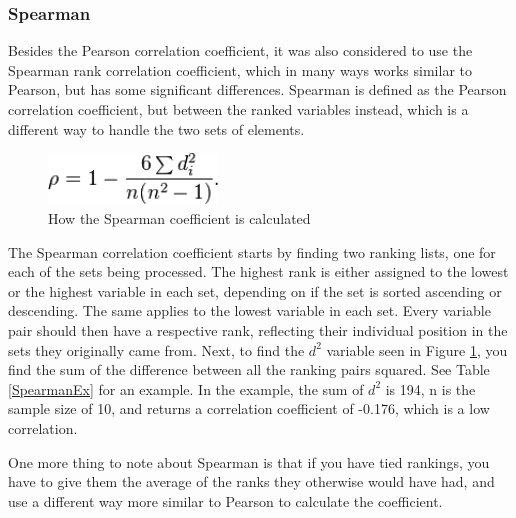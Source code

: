 \subsubsection{Spearman}

Besides the Pearson correlation coefficient, it was also considered to use the Spearman rank correlation coefficient, which in many ways works similar to Pearson, but has some significant differences. Spearman is defined as the Pearson correlation coefficient, but between the ranked variables instead, which is a different way to handle the two sets of elements. \cite{Spearman2}

\begin{figure}[htb]
\centering
\includegraphics[width=0.4\textwidth]{Images/SpearmanCalc.png}
\caption{How the Spearman coefficient is calculated \cite{Spearman2}}
\label{SpearCalc}
\end{figure}

The Spearman correlation coefficient starts by finding two ranking lists, one for each of the sets being processed. The highest rank is either assigned to the lowest or the highest variable in each set, depending on if the set is sorted ascending or descending. The same applies to the lowest variable in each set. Every variable pair should then have a respective rank, reflecting their individual position in the sets they originally came from. Next, to find the $d^2$ variable seen in Figure \ref{SpearCalc}, you find the sum of the difference between all the ranking pairs squared. See Table \ref{SpearmanEx} for an example. In the example, the sum of $d^2$ is 194, n is the sample size of 10, and returns a correlation coefficient of -0.176, which is a low correlation. \cite{Spearman2}

One more thing to note about Spearman is that if you have tied rankings, you have to give them the average of the ranks they otherwise would have had, and use a different way more similar to Pearson to calculate the coefficient. \cite{Spearman1}

